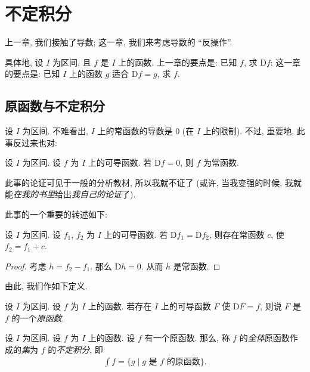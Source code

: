 \chapter{不定积分}

上一章, 我们接触了导数; 这一章, 我们来考虑导数的 ``反操作''.

具体地, 设 $I$ 为区间, 且 $f$ 是 $I$ 上的函数. 上一章的要点是: 已知 $f$, 求 $\mathrm{D}f$; 这一章的要点是: 已知 $I$ 上的函数 $g$ 适合 $\mathrm{D}f = g$, 求 $f$.

\section{原函数与不定积分}

设 $I$ 为区间. 不难看出, $I$ 上的常函数的导数是 $0$ (在 $I$ 上的限制). 不过, 重要地, 此事反过来也对:

\begin{theorem}
    设 $I$ 为区间. 设 $f$ 为 $I$ 上的可导函数. 若 $\mathrm{D}f = 0$, 则 $f$ 为常函数.
\end{theorem}

此事的论证可见于一般的分析教材, 所以我就不证了 (或许, 当我变强的时候, 我就能\emph{在我的书里}给出\emph{我自己的论证}了).

此事的一个重要的转述如下:

\begin{theorem}
    设 $I$ 为区间. 设 $f_1$, $f_2$ 为 $I$ 上的可导函数. 若 $\mathrm{D}{f_1} = \mathrm{D}{f_2}$, 则存在常函数 $c$, 使 $f_2 = f_1 + c$.
\end{theorem}

\begin{proof}
    考虑 $h = f_2 - f_1$. 那么 $\mathrm{D}h = 0$. 从而 $h$ 是常函数.
\end{proof}

由此, 我们作如下定义.

\begin{definition}
    设 $I$ 为区间. 设 $f$ 为 $I$ 上的函数. 若存在 $I$ 上的可导函数 $F$ 使 $\mathrm{D}F = f$, 则说 $F$ 是 $f$ 的一个\emph{原函数}.
\end{definition}

\begin{definition}
    设 $I$ 为区间. 设 $f$ 为 $I$ 上的函数. 设 $f$ 有一个原函数. 那么, 称 $f$ 的\emph{全体}原函数作成的\emph{集}为 $f$ 的\emph{不定积分}, 即
    \begin{align*}
        \int {f} = \{ g \mid \text{$g$ 是 $f$ 的原函数} \}.
    \end{align*}
\end{definition}

